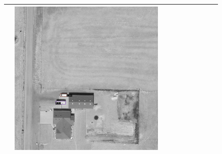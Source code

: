 \begin{figure}[h!]
\begin{tabularx}{\textwidth}{c|*{9}{X}}
    & \includegraphics[trim={300pt 355pt 610pt 570pt},clip,width=\linewidth]{images/015Results/03ablation/comp_images/ir/198.png} \\ \hline


\end{tabularx}
\end{figure}
